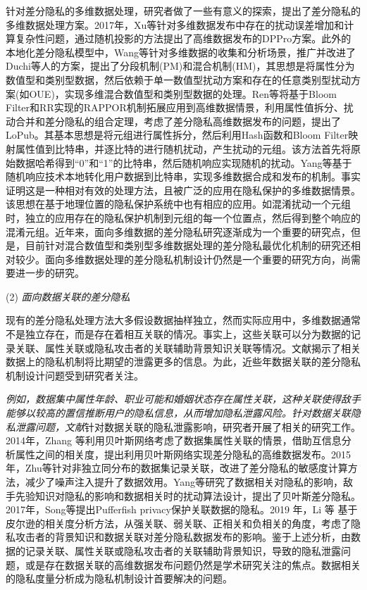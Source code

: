 针对差分隐私的多维数据处理，研究者做了一些有意义的探索，提出了差分隐私的多维数据处理方案。2017年，Xu等\cite{xu2017dppro}针对多维数据发布中存在的扰动误差增加和计算复杂性问题，通过随机投影的方法提出了高维数据发布的DPPro方案。此外的本地化差分隐私模型中，Wang等\cite{wang2019collecting}针对多维数据的收集和分析场景，推广并改进了Duchi等人\cite{duchi2018minimax}的方案，提出了分段机制(PM)和混合机制(HM)，其思想是将属性分为数值型和类别型数据，然后依赖于单一数值型扰动方案和存在的任意类别型扰动方案(如OUE\cite{wang2017locally})，实现多维混合数值型和类别型数据的处理。Ren等\cite{ren2018textsf}将基于Bloom Filter和RR实现的RAPPOR机制拓展应用到高维数据情景，利用属性值拆分、扰动合并和差分隐私的组合定理\cite{kairouz2017the}，考虑了差分隐私高维数据发布的问题，提出了LoPub。其基本思想是将元组进行属性拆分，然后利用Hash函数和Bloom Filter映射属性值到比特串，并逐比特的进行随机扰动，产生扰动的元组。该方法首先将原始数据哈希得到``0''和``1''的比特串，然后随机响应实现随机的扰动。Yang等\cite{yang2017copula}基于随机响应技术本地转化用户数据到比特串，实现多维数据合成和发布的机制。事实证明这是一种相对有效的处理方法，且被广泛的应用在隐私保护的多维数据情景。该思想在基于地理位置的隐私保护系统中也有相应的应用。如混淆扰动一个元组时，独立的应用存在的隐私保护机制到元组的每一个位置点，然后得到整个响应的混淆元组\cite{andres2013geo}。近年来，面向多维数据的差分隐私研究逐渐成为一个重要的研究点，但是，目前针对混合数值型和类别型多维数据处理的差分隐私最优化机制的研究还相对较少。面向多维数据处理的差分隐私机制设计仍然是一个重要的研究方向，尚需要进一步的研究。


(2) {\em 面向数据关联的差分隐私}

现有的差分隐私处理方法大多假设数据抽样独立，然而实际应用中，多维数据通常不是独立存在，而是存在着相互关联的情况。事实上，这些关联可以分为数据的记录关联、属性关联或隐私攻击者的关联辅助背景知识关联等情况。文献揭示了相关数据上的隐私机制将比期望的泄露更多的信息。为此，近些年数据关联的差分隐私机制设计问题受到研究者关注。

{\em 例如，数据集中属性年龄、职业可能和婚姻状态存在属性关联，这种关联使得敌手能够以较高的置信推断用户的隐私信息，从而增加隐私泄露风险。针对数据关联隐私泄露问题，文献}针对数据关联的隐私泄露影响，研究者开展了相关的研究工作。
2014年，Zhang 等\cite{zhang2014privbayes}利用贝叶斯网络考虑了数据集属性关联的情景，借助互信息分析属性之间的相关度\cite{reshef2011detecting,liangjy2016}，提出利用贝叶斯网络实现差分隐私的高维数据发布。2015年，Zhu等\cite{zhu2015correlated}针对非独立同分布的数据集记录关联，改进了差分隐私的敏感度计算方法，减少了噪声注入提升了数据效用。Yang等\cite{yang2015bayesian}研究了数据相关对隐私的影响，敌手先验知识对隐私的影响和数据相关时的扰动算法设计，提出了贝叶斯差分隐私。2017年，Song等\cite{song2017pufferfish}提出Pufferfish privacy保护关联数据的隐私。2019 年，Li 等\cite{li2019impact} 基于皮尔逊的相关度分析方法，从强关联、弱关联、正相关和负相关的角度，考虑了隐私攻击者的背景知识和数据关联对差分隐私数据发布的影响。鉴于上述分析，由数据的记录关联、属性关联或隐私攻击者的关联辅助背景知识，导致的隐私泄露问题，或是存在数据关联的高维数据发布问题仍然是学术研究关注的焦点。数据相关的隐私度量分析成为隐私机制设计首要解决的问题。

